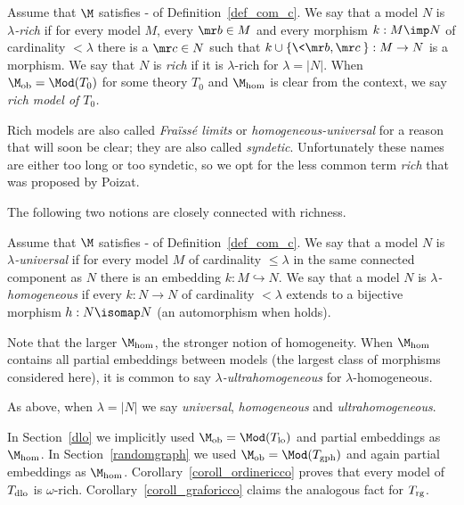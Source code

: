 \begin{definition}\label{def_rich}
Assume that $\M$ satisfies - of Definition~\ref{def_com_c}.
We say that a model $N$ is \emph{$\lambda$-rich\/} if for every model $M$, every ${\mr b}\in M$ and every morphism $k:M\imp N$ of cardinality $<\lambda$ there is a ${\mr c}\in N$ such that $k\cup\{\<{\mr b},{\mr c}\>\}:M\to N$ is a morphism.
We say that $N$ is \emph{rich\/} if it is $\lambda$-rich for $\lambda=|N|$.
When $\M_{\rm ob}=\Mod(T_0)$ for some theory $T_0$ and $\M_{\rm hom}$ is clear from the context, we say \emph{rich model of $T_0$.}
\end{definition}

Rich models are also called \textit{Fra\"iss\'e limits} or \textit{homogeneous-universal\/} for a reason that will soon be clear; they are also called \textit{syndetic}.
Unfortunately these names are either too long or too syndetic, so we opt for the less common term \textit{rich\/} that was proposed by Poizat.

The following two notions are closely connected with richness.

\begin{definition}\label{def_omogenea_universale}
Assume that $\M$ satisfies - of Definition~\ref{def_com_c}.
We say that a model $N$ is \emph{$\lambda$-universal\/} if for every model $M$ of cardinality $\le\lambda$ in the same connected component as $N$ there is an embedding $k:M\hookrightarrow N$.
We say that a model $N$ is \emph{$\lambda$-homogeneous\/} if every $k:N\to N$ of cardinality $<\lambda$ extends to a bijective morphism $h:N\isomap N$ (an automorphism when  holds).

Note that the larger $\M_{\rm hom}$, the stronger notion of homogeneity.
When  $\M_{\rm hom}$ contains all partial embeddings between models (the largest class of morphisms considered here), it is common to say \emph{$\lambda$-ultra\-homo\-geneous\/} for $\lambda$-homogeneous.

As above, when $\lambda=|N|$ we say \emph{universal}, \emph{homogeneous} and \emph{ultrahomogeneous}.
\end{definition}

In Section~\ref{dlo} we implicitly used $\M_{\rm ob}=\Mod(T_{\rm lo})$ and partial embeddings as $\M_{\rm hom}$.
In Section~\ref{randomgraph} we used $\M_{\rm ob}=\Mod(T_{\rm gph})$ and again partial embeddings as $\M_{\rm hom}$.
Corollary~\ref{coroll_ordinericco} proves that every model of $T_{\rm dlo}$ is $\omega$-rich.
Corollary~\ref{coroll_graforicco} claims the analogous fact for $T_{\rm rg}$.

